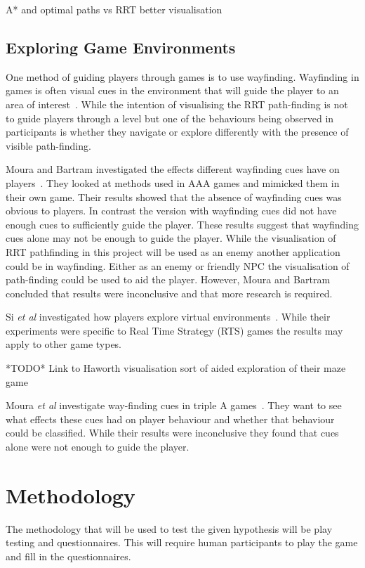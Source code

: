 \documentclass[journal]{IEEEtran}
\begin{document}
A* and optimal paths vs RRT better visualisation 


\subsection{Exploring Game Environments}
One method of guiding players through games is to use wayfinding. Wayfinding in games is often visual cues in the environment that will guide the player to an area of interest~\cite{si2017, Bacim2008}. While the intention of visualising the RRT path-finding is not to guide players through a level but one of the behaviours being observed in participants is whether they  navigate or explore differently with the presence of visible path-finding. 

Moura and Bartram investigated the effects different wayfinding cues have on players~\cite{moura2014}.  They looked at methods used in AAA games and mimicked them in their own game. Their results showed that the absence of wayfinding cues was obvious to players. In contrast the version with wayfinding cues did not have enough cues to sufficiently guide the player. These results suggest that wayfinding cues alone may not be enough to guide the player. While the visualisation of RRT pathfinding in this project will be used as an enemy another application could be in wayfinding. Either as an enemy or friendly NPC the visualisation of path-finding could be used to aid the player. However, Moura and Bartram concluded that results were inconclusive and that more research is required. 
 
Si \textit{et al} investigated how players explore virtual environments~\cite{si2017}. While their experiments were specific to Real Time Strategy (RTS) games the results may apply to other game types.

*TODO* Link to Haworth visualisation sort of aided exploration of their maze game


Moura \textit{et al} investigate way-finding cues in triple A games~\cite{moura2014}. They want to see what effects these cues had on player behaviour and whether that behaviour could be classified. While their results were inconclusive they found that cues alone were not enough to guide the player.  

\section{Methodology} %
The methodology that will be used to test the given hypothesis will be play testing and questionnaires. This will require human participants to play the game and fill in the questionnaires. 
\end{document}

